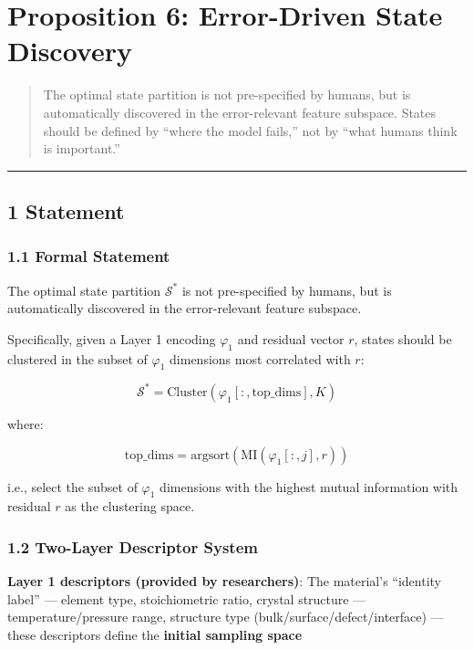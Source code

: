\documentclass[
  12pt,
]{article}
\author{SCX}
\date{2026}
\begin{document}
\section{Proposition 6: Error-Driven State
Discovery}\label{proposition-6-error-driven-state-discovery}

\begin{quote}
The optimal state partition is not pre-specified by humans, but is automatically discovered in the error-relevant feature subspace. States should be defined by ``where the model fails,'' not by ``what humans think is important.''
\end{quote}

\begin{center}\rule{0.5\linewidth}{0.5pt}\end{center}

\subsection{1 Statement}\label{statement}

\subsubsection{1.1 Formal Statement}\label{formal-statement-prop6}

The optimal state partition \(\mathcal{S}^*\)
is not pre-specified by humans, but is automatically discovered in the error-relevant feature subspace.

Specifically, given a Layer 1 encoding \(\varphi_1\) and residual vector
\(r\), states should be clustered in the subset of \(\varphi_1\) dimensions most correlated with \(r\):

\[\mathcal{S}^* = \text{Cluster}(\varphi_1[:, \text{top\_dims}], K)\]

where:

\[\text{top\_dims} = \text{argsort}(\text{MI}(\varphi_1[:, j], r))\]

i.e., select the subset of \(\varphi_1\) dimensions with the highest mutual information with residual \(r\) as the clustering space.

\subsubsection{1.2 Two-Layer Descriptor System}\label{two-layer-descriptor-system}

\textbf{Layer 1 descriptors (provided by researchers)}: The material's ``identity label'' ---
element type, stoichiometric ratio, crystal structure ---
temperature/pressure range, structure type (bulk/surface/defect/interface) ---
these descriptors define the \textbf{initial sampling space}
\end{document}
